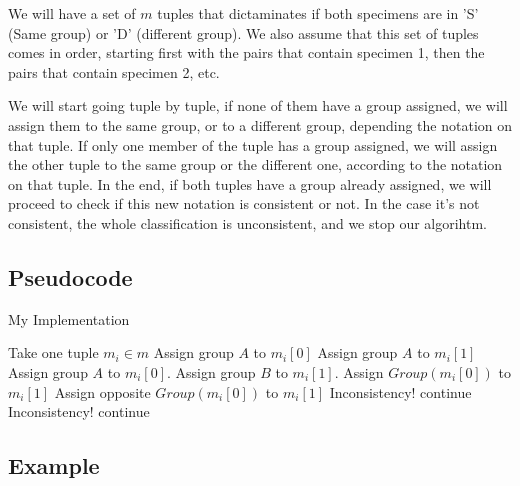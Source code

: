 \documentclass{article}
\begin{document}
We will have a set of $m$ tuples that dictaminates if both specimens are in 'S' (Same group) or 'D' (different group). We also assume that this set of tuples comes in order, starting first with the pairs that contain specimen 1, then the pairs that contain specimen 2, etc.

We will start going tuple by tuple, if none of them have a group assigned, we will assign them to the same group, or to a different group, depending the notation on that tuple. If only one member of the tuple has a group assigned, we will assign the other tuple to the same group or the different one, according to the notation on that tuple. In the end, if both tuples have a group already assigned, we will proceed to check if this new notation is consistent or not. In the case it's not consistent, the whole classification is unconsistent, and we stop our algorihtm.

\subsection*{Pseudocode}

\begin{algorithm}[H]
\caption{My Implementation}
\begin{algorithmic}[1]
 \State Take one tuple $m_i \in m$
   \State Assign group $A$ to $m_i[0]$
   \State Assign group $A$ to $m_i[1]$
   \State Assign group $A$ to $m_i[0]$.
   \State Assign group $B$ to $m_i[1]$.
  \EndIf
 \EndIf
   \State Assign $Group(m_i[0])$ to $m_i[1]$
   \State Assign opposite $Group(m_i[0])$ to $m_i[1]$
  \EndIf
 \EndIf
    \State Inconsistency!
   \Else
    \State continue
   \EndIf
    \State Inconsistency!
   \Else
    \State continue
   \EndIf
  \EndIf
 \EndIf
\EndWhile
\end{algorithmic}
\end{algorithm}

\subsection*{Example}
\end{document}
